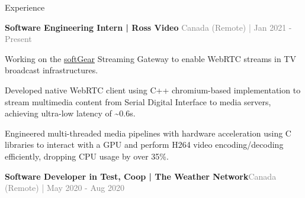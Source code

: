 \documentclass[hidelinks]{resume} %
\begin{document}
\vspace{-.20cm}
\begin{rSection}{Experience}
\vspace{-.1cm}
\begin{rSubsection}{\textbf{Software Engineering Intern | Ross Video} }{\textcolor{gray}{\small Canada (Remote) | Jan 2021 - Present}}{}

    \begin{bulletpoints}
        \vspace{-.10cm}
        \item Working on the \href{https://www.rossvideo.com/products-services/infrastructure/softgear-software-based-signal-processing-platform/}{\underline{softGear}} Streaming Gateway to enable WebRTC streams in TV broadcast infrastructures.
        \vspace{-.13cm}
        \item Developed native WebRTC client using C++ chromium-based implementation to stream multimedia content from Serial Digital Interface to media servers, achieving ultra-low latency of \textasciitilde0.6s.
        \vspace{-.13cm}
        \item Engineered multi-threaded media pipelines with hardware acceleration using C libraries to interact with a GPU and perform H264 video encoding/decoding efficiently, dropping CPU usage by over 35\%.
        \vspace{-.10cm}
    \end{bulletpoints}
\end{rSubsection}
\begin{rSubsection}{\textbf{Software Developer in Test, Coop | The Weather Network}}{\textcolor{gray}{\small Canada (Remote) | May 2020 - Aug 2020}}{}


\end{rSubsection}
\end{rSection}
\end{document}
